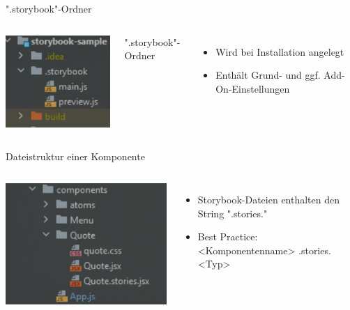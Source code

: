 \documentclass{beamer}
\begin{document}
\begin{frame}{".storybook"-Ordner}
	\begin{columns}	
		\includegraphics{Images/file/storybook-project-folder.pdf}
		
		".storybook"-Ordner
		\begin{itemize}
			\item Wird bei Installation angelegt
			\item Enthält Grund- und ggf. Add-On-Einstellungen
		\end{itemize}
	\end{columns}
\end{frame}

\begin{frame}{Dateistruktur einer Komponente}
	\begin{columns}	
		\column{0.5\textwidth}
		\includegraphics{Images/file/storybook-component-folder.pdf}
		
		\column{0.5\textwidth}
		\begin{itemize}
			\item Storybook-Dateien enthalten den String "\alert{.stories.}"
			\item Best Practice: <Komponentenname> \alert{.stories.}{}<Typ>
		\end{itemize}
	\end{columns}
\end{frame}
\end{document}
